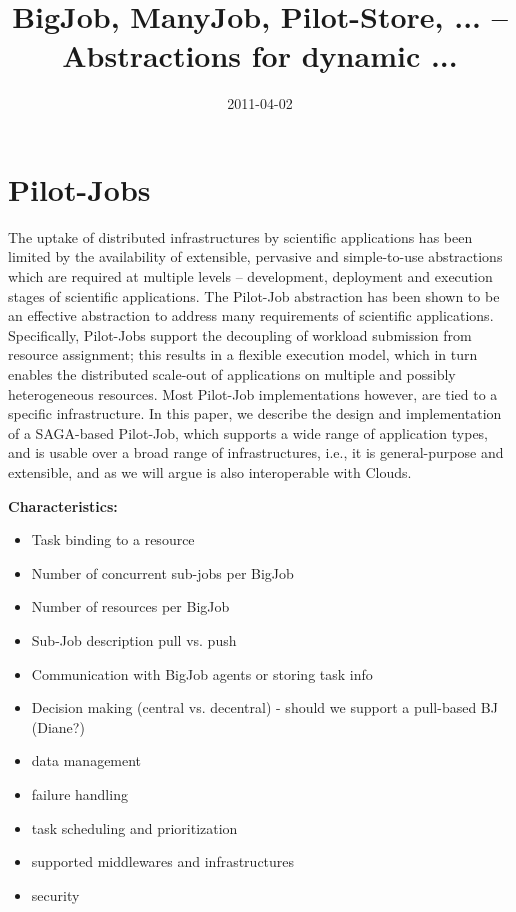 \documentclass[]{article}
\title{BigJob, ManyJob, Pilot-Store, ... -- Abstractions for dynamic ...}
\author{  }
\date{2011-04-02}
\begin{document}
\ifpdf
{}
\else
{}
\fi

\maketitle


\section{Pilot-Jobs}

The uptake of distributed infrastructures by scientific applications has been
limited by the availability of extensible, pervasive and simple-to-use
abstractions which are required at multiple levels – development, deployment
and execution stages of scientific applications. The Pilot-Job abstraction has
been shown to be an effective abstraction to address many requirements of
scientific applications. Specifically, Pilot-Jobs support the decoupling of
workload submission from resource assignment; this results in a flexible
execution model, which in turn enables the distributed scale-out of
applications on multiple and possibly heterogeneous resources. Most Pilot-Job
implementations however, are tied to a specific infrastructure. In this paper,
we describe the design and implementation of a SAGA-based Pilot-Job, which
supports a wide range of application types, and is usable over a broad range
of infrastructures, i.e., it is general-purpose and extensible, and as we will
argue is also interoperable with Clouds.

\noindent
\textbf{Characteristics:}
\begin{itemize}
	\item Task binding to a resource
	\item Number of concurrent sub-jobs per BigJob
	\item Number of resources per BigJob
	\item Sub-Job description pull vs. push
	\item Communication with BigJob agents or storing task info
	\item Decision making (central vs. decentral) - should we support a pull-based BJ (Diane?)
	\item data management
	\item failure handling
	\item task scheduling and prioritization
	\item supported middlewares and infrastructures
	\item security
\end{itemize}
\end{document}
